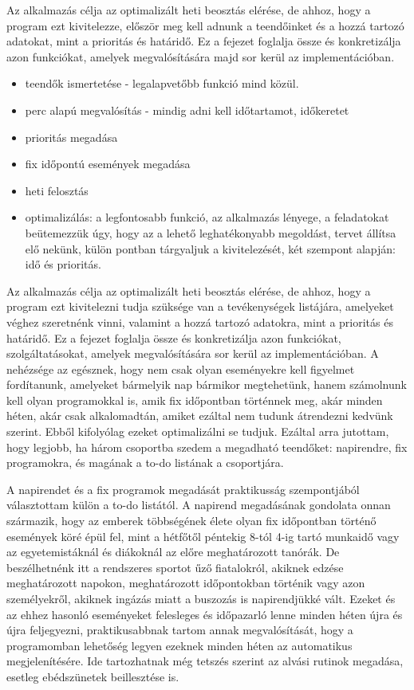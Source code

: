 

Az alkalmazás célja az optimalizált heti beosztás elérése, de ahhoz, hogy a program ezt kivitelezze, először meg kell adnunk a teendőinket és a hozzá tartozó adatokat, mint a prioritás és határidő. Ez a fejezet foglalja össze és konkretizálja azon funkciókat, amelyek megvalósítására majd sor kerül az implementációban.

\begin{itemize}
	\item teendők ismertetése - legalapvetőbb funkció mind közül.
	\item perc alapú megvalósítás - mindig adni kell időtartamot, időkeretet
	\item prioritás megadása
	\item fix időpontú események megadása
	\item heti felosztás
	\item optimalizálás: a legfontosabb funkció, az alkalmazás lényege, a feladatokat beütemezzük úgy, hogy az a lehető leghatékonyabb megoldást, tervet állítsa elő nekünk, külön pontban tárgyaljuk a kivitelezését, két szempont alapján: idő és prioritás.
\end{itemize}

Az alkalmazás célja az optimalizált heti beosztás elérése, de ahhoz, hogy a program ezt kivitelezni tudja szüksége van a tevékenységek listájára, amelyeket véghez szeretnénk vinni, valamint a hozzá tartozó adatokra, mint a prioritás és határidő. Ez a fejezet foglalja össze és konkretizálja azon funkciókat, szolgáltatásokat, amelyek megvalósítására sor kerül az implementációban. A nehézsége az egésznek, hogy nem csak olyan eseményekre kell figyelmet fordítanunk, amelyeket bármelyik nap bármikor megtehetünk, hanem számolnunk kell olyan programokkal is, amik fix időpontban történnek meg, akár minden héten, akár csak alkalomadtán, amiket ezáltal nem tudunk átrendezni kedvünk szerint. Ebből kifolyólag ezeket optimalizálni se tudjuk. Ezáltal arra jutottam, hogy legjobb, ha három csoportba szedem a megadható teendőket: napirendre, fix programokra, és magának a to-do listának a csoportjára.


A napirendet és a fix programok megadását praktikusság szempontjából választottam külön a to-do listától. A napirend megadásának gondolata onnan származik, hogy az emberek többségének élete olyan fix időpontban történő események köré épül fel, mint a hétfőtől péntekig 8-tól 4-ig tartó munkaidő vagy az egyetemistáknál és diákoknál az előre meghatározott tanórák. De beszélhetnénk itt a rendszeres sportot űző fiatalokról, akiknek edzése meghatározott napokon, meghatározott időpontokban történik vagy azon személyekről, akiknek ingázás miatt a buszozás is napirendjükké vált. Ezeket és az ehhez hasonló eseményeket felesleges és időpazarló lenne minden héten újra és újra feljegyezni, praktikusabbnak tartom annak megvalósítását, hogy a programomban lehetőség legyen ezeknek minden héten az automatikus megjelenítésére. Ide tartozhatnak még tetszés szerint az alvási rutinok megadása, esetleg ebédszünetek beillesztése is.

